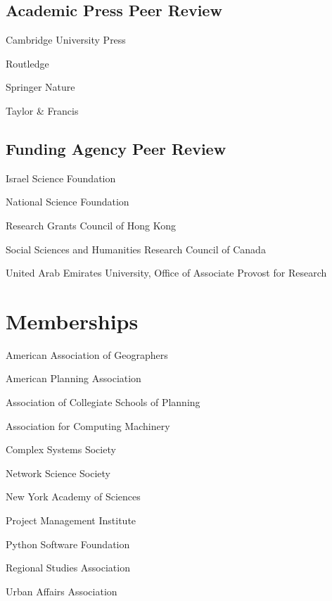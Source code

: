 \documentclass[11pt,letterpaper]{report}
\newcommand{\listitemspace}{0.25em}
\renewenvironment{itemize}
{\begin{list}{}{\setlength{\leftmargin}{0em}
                \setlength{\parskip}{0em}
                \setlength{\itemsep}{\listitemspace}
                \setlength{\parsep}{\listitemspace}}}
{\end{list}}
\begin{document}
    \subsection*{Academic Press Peer Review}

    \begin{itemize}

        \item Cambridge University Press
        \item Routledge
        \item Springer Nature
        \item Taylor \& Francis

    \end{itemize}

    \subsection*{Funding Agency Peer Review}

    \begin{itemize}

        \item Israel Science Foundation
        \item National Science Foundation
        \item Research Grants Council of Hong Kong
        \item Social Sciences and Humanities Research Council of Canada
        \item United Arab Emirates University, Office of Associate Provost for Research

    \end{itemize}



    \section*{Memberships}

    \begin{itemize}

        \item American Association of Geographers
        \item American Planning Association
        \item Association of Collegiate Schools of Planning
        \item Association for Computing Machinery
        \item Complex Systems Society
        \item Network Science Society
        \item New York Academy of Sciences
        \item Project Management Institute
        \item Python Software Foundation
        \item Regional Studies Association
        \item Urban Affairs Association

    \end{itemize}
\end{document}
